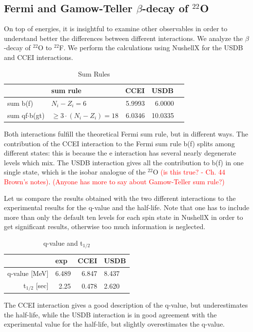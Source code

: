 \subsection{Fermi and Gamow-Teller $\beta$-decay of $^{22}$O}
%
On top of energies, it is insightful to examine other observables in order to understand better the differences between different interactions. We analyze the $\beta$-decay of $^{22}$O to $^{22}$F.
We perform the calculations using NushellX for the USDB and CCEI interactions. 
\begin{table}[h!]
\caption{Sum Rules}
\begin{center}
\begin{tabular}{l@{\qquad}l@{\qquad}r@{\qquad}rl}
\hline
\multicolumn{1}{l}{\rule{0pt}{12pt}
                   }&\multicolumn{1}{l}{\rule{0pt}{12pt} sum rule}&\multicolumn{1}{l}{CCEI}&\multicolumn{2}{l}{USDB}\\[2pt]
\hline\rule{0pt}{12pt}
sum b(f)            &  $N_i-Z_i=6$   & 5.9993 & 6.0000 &\\
sum qf$\cdot$b(gt)  &  $\ge 3\cdot(N_i-Z_i)=18$  & 6.0346 & 10.0335 &\\[2pt]
\hline
\end{tabular}
\end{center}
\end{table}

Both interactions fulfill the theoretical Fermi sum rule, but in different ways.
The contribution of the CCEI interaction to the Fermi sum rule b(f) splits among different states: this is because the e interaction has several nearly degenerate levels which mix. The USDB interaction gives all the contribution to b(f) in one single state, which is the isobar analogue of the $^{22}$O \textcolor{red}{(is this true? - Ch. 44 Brown's notes)}. 
\textcolor{red}{(Anyone has more to say about Gamow-Teller sum rule?)}

Let us compare the results obtained with the two different interactions to the experimental results for the q-value and the half-life. Note that one has to include more than only the default ten levels for each spin state in NushellX in order to get significant results, otherwise too much information is neglected.
\begin{table}[h!]
\caption{q-value and t$_{1/2}$}
\begin{center}
\begin{tabular}{r@{\qquad}r@{\qquad}r@{\qquad}r@{\qquad}l}
\hline
\multicolumn{1}{l}{\rule{0pt}{12pt}
                   }&\multicolumn{1}{l}{exp}&\multicolumn{1}{l}{CCEI}&\multicolumn{2}{l}{USDB}\\[2pt]
\hline\rule{0pt}{12pt}
q-value [MeV]   &     6.489 & 6.847 & 8.437 &\\
t$_{1/2}$ [sec] &     2.25  & 0.478 & 2.620 &\\[2pt]
\hline
\end{tabular}
\end{center}
\end{table}

The CCEI interaction gives a good description of the q-value, but underestimates the half-life, while the USDB interaction is in good agreement with the experimental value for the half-life, but slightly overestimates the q-value.
